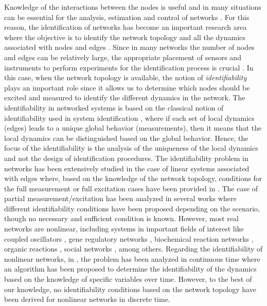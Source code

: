 \documentclass[letterpaper,10pt,journal]{IEEEtran}
\begin{document}
Knowledge of the interactions between the nodes is useful and in many situations can be essential for the analysis, estimation and control of networks \cite{wang2014pinning}. For this reason, the identification of networks has become an important research area where the objective is to identify the network topology and all the dynamics associated with nodes and edges \cite{gonccalves2008necessary,mauroy2017spectral,jahandari2022optimal,verhaegen2022data}. Since in many networks the number of nodes and edges can be relatively large, the appropriate placement of sensors and instruments to perform experiments for the identification process is crucial \cite{ramaswamy2019generalized,bombois2023informativity,kivits2023identifiability}. In this case, when the network topology is available, the notion of \emph{identifiability} plays an important role since it allows us to determine which nodes should be excited and measured to identify the different dynamics in the network. 
The identifiability in networked systems is based on the classical notion of identifiability used in system identification \cite{ljung1999system}, where if each set of local dynamics (edges) leads to a unique global behavior (measurements), then it means that the local dynamics can be distinguished based on the global behavior. Hence, the focus of the identifiability is the analysis of the uniqueness of the local dynamics and not the design of identification procedures. 
The identifiability problem in networks has been extensively studied in the case of linear systems associated with edges where, based on the knowledge of the network topology, conditions for the full measurement or full excitation cases have been provided in \cite{hendrickx2019identifiability,vanwaarde2020necessary}. The case of partial measurement/excitation has been analyzed in several works \cite{legat2020local,legat2021path,bazanella2019network,cheng2023necessary,legat2023combinatorial} where different identifiability conditions have been proposed depending on the scenario, though no necessary and sufficient condition is known. However, most real networks are nonlinear, including systems in important fields of interest like
coupled oscillators \cite{dorfler2014synchronization}, gene regulatory networks \cite{pan2012reconstruction}, biochemical reaction networks \cite{aalto2020gene}, organic reactions \cite{bures2023organic}, social networks \cite{bizyaeva2023nonlinear}, among others. Regarding the identifiability of nonlinear networks, in \cite{verdiere2024identifiability}, the problem has been analyzed in continuous time where an algorithm has been proposed to determine the identifiability of the dynamics based on the knowledge of specific variables over time. However, to the best of our knowledge, no identifiability conditions based on the network topology have been derived for nonlinear networks in discrete time.
\end{document}
